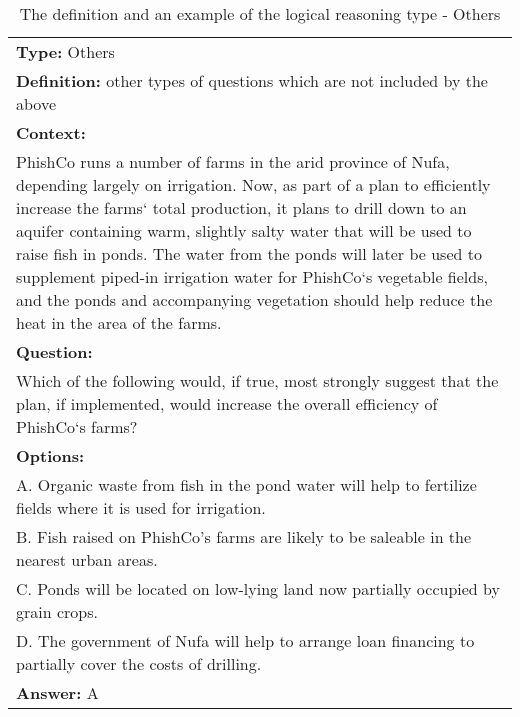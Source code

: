 \documentclass{article} \usepackage{iclr2020_conference,times}
\begin{document}
\begin{table}[htbp]
	\small
	\centering
	\caption{The definition and an example of the logical reasoning type - Others}
	\begin{tabular}{|p{}|}
		\hline
		{\bf Type: }Others \\
		
		{\bf Definition: }other types of questions which are not included by the above
		\\
		\hline
		{\bf Context:} \\PhishCo runs a number of farms in the arid province of Nufa, depending largely on irrigation. Now, as part of a plan to efficiently increase the farms` total production, it plans to drill down to an aquifer containing warm, slightly salty water that will be used to raise fish in ponds. The water from the ponds will later be used to supplement piped-in irrigation water for PhishCo`s vegetable fields, and the ponds and accompanying vegetation should help reduce the heat in the area of the farms.
		\\
		{\bf Question:}\\Which of the following would, if true, most strongly suggest that the plan, if implemented, would increase the overall efficiency of PhishCo`s farms?\\
		{\bf Options:}\\
			A. Organic waste from fish in the pond water will help to fertilize fields where it is used for irrigation.\\
			B. Fish raised on PhishCo's farms are likely to be saleable in the nearest urban areas.\\
			C. Ponds will be located on low-lying land now partially occupied by grain crops.\\
			D. The government of Nufa will help to arrange loan financing to partially cover the costs of drilling.\\
		{\bf Answer: }A \\
		\hline
	\end{tabular}
	\label{tab:others}
	
\end{table}
\newpage
\end{document}
